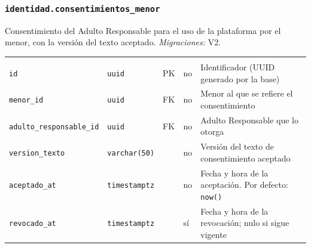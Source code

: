 \subsubsection{\texorpdfstring{\texttt{identidad.consentimientos\_\allowbreak{}menor}}{identidad.consentimientos\_menor}}\label{dd:identidad.consentimientos_menor}

Consentimiento del Adulto Responsable para el uso de la plataforma por el menor, con la versión del texto aceptado. \emph{Migraciones:} V2.

{\small
\begin{xltabular}{\textwidth}{@{}>{\raggedright\arraybackslash}p{3.6cm} >{\raggedright\arraybackslash}p{2.3cm} >{\raggedright\arraybackslash}p{1cm} >{\centering\arraybackslash}p{0.85cm} L@{}}
    \toprule
     &  &  &  &  \\
    \midrule
    \endfirsthead
    \toprule
     &  &  &  &  \\
    \midrule
    \endhead
    \bottomrule
    \endfoot
    \texttt{id} & \texttt{uuid} & PK & no & Identificador (UUID generado por la base) \\
    \texttt{menor\_\allowbreak{}id} & \texttt{uuid} & FK & no & Menor al que se refiere el consentimiento \\
    \texttt{adulto\_\allowbreak{}responsable\_\allowbreak{}id} & \texttt{uuid} & FK & no & Adulto Responsable que lo otorga \\
    \texttt{version\_\allowbreak{}texto} & \texttt{varchar(\allowbreak{}50)} &  & no & Versión del texto de consentimiento aceptado \\
    \texttt{aceptado\_\allowbreak{}at} & \texttt{timestamptz} &  & no & Fecha y hora de la aceptación. Por defecto: \texttt{now(\allowbreak{})} \\
    \texttt{revocado\_\allowbreak{}at} & \texttt{timestamptz} &  & sí & Fecha y hora de la revocación; nulo si sigue vigente \\
\end{xltabular}
}

